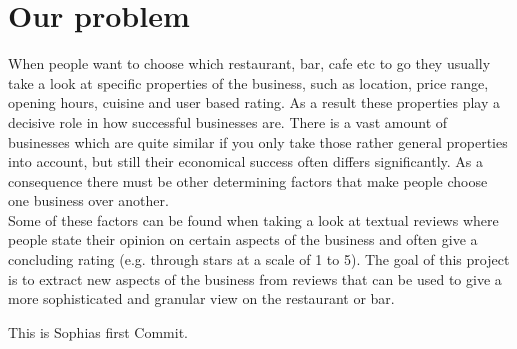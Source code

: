 \section{Our problem}
\label{cha:problem}

When people want to choose which restaurant, bar, cafe etc to go they usually take a look at specific properties of the business, such as location, price range, opening hours, cuisine and user based rating. As a result these properties play a decisive role in how successful businesses are. There is a vast amount of businesses which are quite similar if you only take those rather general properties into account, but still their economical success often differs significantly. As a consequence there must be other determining factors that make people choose one business over another. \\
Some of these factors can be found when taking a look at textual reviews where people state their opinion on certain aspects of the business and often give a concluding rating (e.g. through stars at a scale of 1 to 5). The goal of this project is to extract new aspects of the business from reviews that can be used to give a more sophisticated and granular view on the restaurant or bar. 

This is Sophias first Commit.
